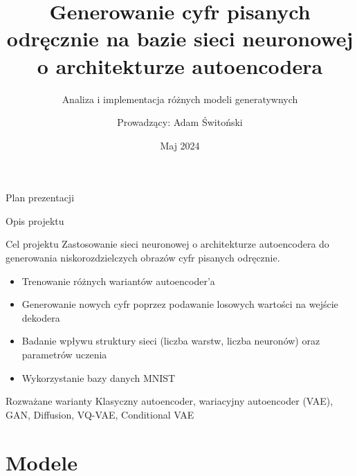 \documentclass{beamer}
\title{Generowanie cyfr pisanych odręcznie na bazie sieci neuronowej o architekturze autoencodera}
\subtitle{Analiza i implementacja różnych modeli generatywnych}
\author{Prowadzący: Adam Świtoński}
\institute{Politechnika Śląska}
\date{Maj 2024}
\begin{document}
\begin{frame}
  \titlepage
\end{frame}

\begin{frame}{Plan prezentacji}
  \tableofcontents
\end{frame}

\begin{frame}{Opis projektu}
  \begin{block}{Cel projektu}
    Zastosowanie sieci neuronowej o architekturze autoencodera do generowania niskorozdzielczych obrazów cyfr pisanych odręcznie.
  \end{block}
  
  \begin{itemize}
    \item Trenowanie różnych wariantów autoencoder'a
    \item Generowanie nowych cyfr poprzez podawanie losowych wartości na wejście dekodera
    \item Badanie wpływu struktury sieci (liczba warstw, liczba neuronów) oraz parametrów uczenia
    \item Wykorzystanie bazy danych MNIST
  \end{itemize}
  
  \begin{block}{Rozważane warianty}
    Klasyczny autoencoder, wariacyjny autoencoder (VAE), GAN, Diffusion, VQ-VAE, Conditional VAE
  \end{block}
\end{frame}


\section{Modele}
\end{document}
